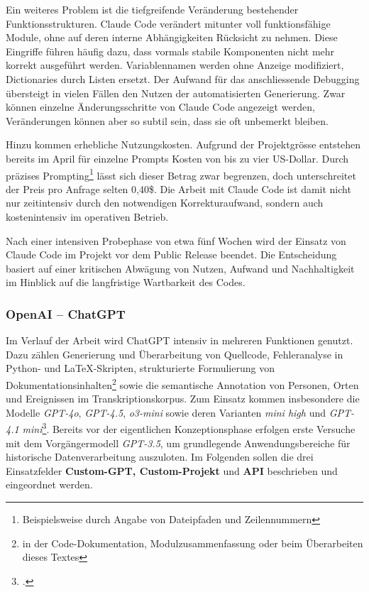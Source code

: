 \documentclass[12pt, a4paper, ngerman, bidi=default]{article}
\let\cite\footcite
\begin{document}
Ein weiteres Problem ist die tiefgreifende Veränderung bestehender Funktionsstrukturen. Claude Code verändert mitunter voll funktionsfähige Module, ohne auf deren interne Abhängigkeiten Rücksicht zu nehmen. Diese Eingriffe führen häufig dazu, dass vormals stabile Komponenten nicht mehr korrekt ausgeführt werden. Variablennamen werden ohne Anzeige modifiziert, Dictionaries durch Listen ersetzt. Der Aufwand für das anschliessende Debugging übersteigt in vielen Fällen den Nutzen der automatisierten Generierung. Zwar können einzelne Änderungsschritte von Claude Code angezeigt werden, Veränderungen können aber so subtil sein, dass sie oft unbemerkt bleiben.

Hinzu kommen erhebliche Nutzungskosten. Aufgrund der Projektgrösse entstehen bereits im April für einzelne Prompts Kosten von bis zu vier US-Dollar. Durch präzises Prompting\footnote{Beispielsweise durch Angabe von Dateipfaden und Zeilennummern} lässt sich dieser Betrag zwar begrenzen, doch unterschreitet der Preis pro Anfrage selten 0,40\$. Die Arbeit mit Claude Code ist damit nicht nur zeitintensiv durch den notwendigen Korrekturaufwand, sondern auch kostenintensiv im operativen Betrieb.

Nach einer intensiven Probephase von etwa fünf Wochen wird der Einsatz von Claude Code im Projekt vor dem Public Release beendet. Die Entscheidung basiert auf einer kritischen Abwägung von Nutzen, Aufwand und Nachhaltigkeit im Hinblick auf die langfristige Wartbarkeit des Codes.

\subsubsection{OpenAI – ChatGPT}\label{subsec:OpenAI}

Im Verlauf der Arbeit wird ChatGPT intensiv in mehreren Funktionen genutzt. Dazu zählen Generierung und Überarbeitung von Quellcode, Fehleranalyse in Python- und LaTeX-Skripten, strukturierte Formulierung von Dokumentationsinhalten\footnote{in der Code-Dokumentation, Modulzusammenfassung oder beim Überarbeiten dieses Textes} sowie die semantische Annotation von Personen, Orten und Ereignissen im Transkriptionskorpus. Zum Einsatz kommen insbesondere die Modelle \textit{GPT-4o}, \textit{GPT-4.5}, \textit{o3-mini} sowie deren Varianten \textit{mini high} und \textit{GPT-4.1 mini}\cite[vgl.][]{noauthor_model_nodate}. 
Bereits vor der eigentlichen Konzeptionsphase erfolgen erste Versuche mit dem Vorgängermodell \textit{GPT-3.5}, um grundlegende Anwendungsbereiche für historische Datenverarbeitung auszuloten. Im Folgenden sollen die drei Einsatzfelder \textbf{Custom-GPT, Custom-Projekt} und \textbf{API} beschrieben und eingeordnet werden.
\end{document}
